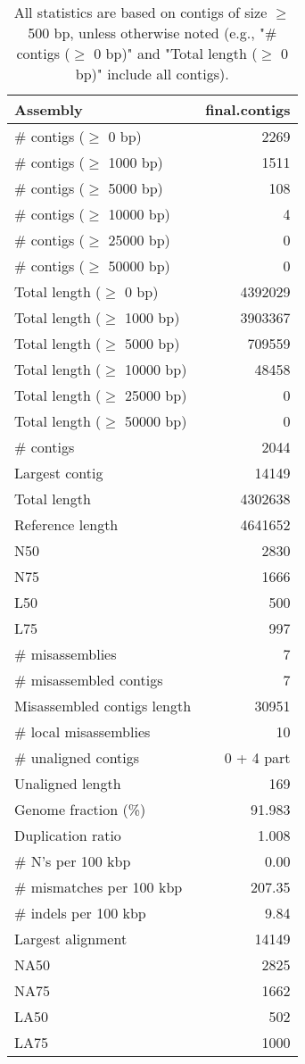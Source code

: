 \documentclass[12pt,a4paper]{article}
\begin{document}
\begin{table}[ht]
\begin{center}
\caption{All statistics are based on contigs of size $\geq$ 500 bp, unless otherwise noted (e.g., "\# contigs ($\geq$ 0 bp)" and "Total length ($\geq$ 0 bp)" include all contigs).}
\begin{tabular}{|l*{1}{|r}|}
\hline
Assembly & final.contigs \\ \hline
\# contigs ($\geq$ 0 bp) & 2269 \\ \hline
\# contigs ($\geq$ 1000 bp) & 1511 \\ \hline
\# contigs ($\geq$ 5000 bp) & 108 \\ \hline
\# contigs ($\geq$ 10000 bp) & 4 \\ \hline
\# contigs ($\geq$ 25000 bp) & 0 \\ \hline
\# contigs ($\geq$ 50000 bp) & 0 \\ \hline
Total length ($\geq$ 0 bp) & 4392029 \\ \hline
Total length ($\geq$ 1000 bp) & 3903367 \\ \hline
Total length ($\geq$ 5000 bp) & 709559 \\ \hline
Total length ($\geq$ 10000 bp) & 48458 \\ \hline
Total length ($\geq$ 25000 bp) & 0 \\ \hline
Total length ($\geq$ 50000 bp) & 0 \\ \hline
\# contigs & 2044 \\ \hline
Largest contig & 14149 \\ \hline
Total length & 4302638 \\ \hline
Reference length & 4641652 \\ \hline
N50 & 2830 \\ \hline
N75 & 1666 \\ \hline
L50 & 500 \\ \hline
L75 & 997 \\ \hline
\# misassemblies & 7 \\ \hline
\# misassembled contigs & 7 \\ \hline
Misassembled contigs length & 30951 \\ \hline
\# local misassemblies & 10 \\ \hline
\# unaligned contigs & 0 + 4 part \\ \hline
Unaligned length & 169 \\ \hline
Genome fraction (\%) & 91.983 \\ \hline
Duplication ratio & 1.008 \\ \hline
\# N's per 100 kbp & 0.00 \\ \hline
\# mismatches per 100 kbp & 207.35 \\ \hline
\# indels per 100 kbp & 9.84 \\ \hline
Largest alignment & 14149 \\ \hline
NA50 & 2825 \\ \hline
NA75 & 1662 \\ \hline
LA50 & 502 \\ \hline
LA75 & 1000 \\ \hline
\end{tabular}
\end{center}
\end{table}
\end{document}
